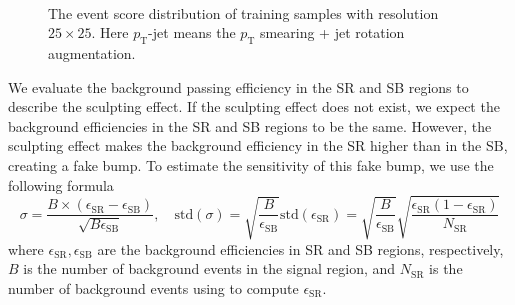 \documentclass[12pt]{article}
\begin{document}
\begin{figure}[htpb]
{            }
             \\
            \caption{The event score distribution of training samples with resolution $25\times 25$. Here $p_{\text{T}}$-jet means the $p_{\text{T}}$ smearing + jet rotation augmentation.}
            \label{fig:event_score_train_test_SR_SB_res_25}
        \end{figure}

        We evaluate the background passing efficiency in the SR and SB regions to describe the sculpting effect. If the sculpting effect does not exist, we expect the background efficiencies in the SR and SB regions to be the same. However, the sculpting effect makes the background efficiency in the SR higher than in the SB, creating a fake bump. To estimate the sensitivity of this fake bump, we use the following formula
        \begin{equation}
            \sigma = \frac{B\times \left( \epsilon_{\text{SR}} - \epsilon_{\text{SB}} \right)}{\sqrt{B \epsilon_{\text{SB}}}}, \quad \mathrm{std}\left( \sigma \right) = \sqrt{\frac{B}{\epsilon_{\text{SB}}}} \mathrm{std}\left( \epsilon_{\text{SR}} \right) = \sqrt{\frac{B}{\epsilon_{\text{SB}}}} \sqrt{\frac{\epsilon_{\text{SR}}(1-\epsilon_{\text{SR}})}{N_{\text{SR}}}}
        \end{equation}
        where $\epsilon_{\text{SR}}, \epsilon_{\text{SB}}$ are the background efficiencies in SR and SB regions, respectively, $B$ is the number of background events in the signal region, and $N_{\text{SR}}$ is the number of background events using to compute $\epsilon_{\text{SR}}$.
\end{document}
